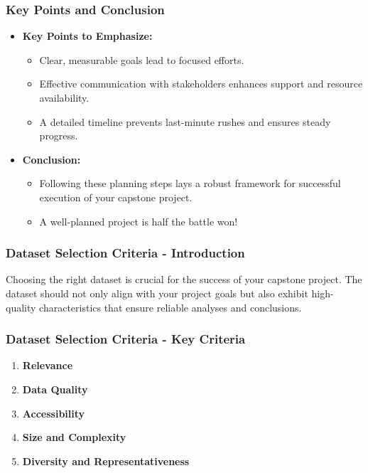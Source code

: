 \documentclass[aspectratio=169]{beamer}
\begin{document}
\begin{frame}[fragile]
    \frametitle{Key Points and Conclusion}
    \begin{itemize}
        \item \textbf{Key Points to Emphasize:}
        \begin{itemize}
            \item Clear, measurable goals lead to focused efforts.
            \item Effective communication with stakeholders enhances support and resource availability.
            \item A detailed timeline prevents last-minute rushes and ensures steady progress.
        \end{itemize}
        
        \item \textbf{Conclusion:}
        \begin{itemize}
            \item Following these planning steps lays a robust framework for successful execution of your capstone project.
            \item A well-planned project is half the battle won!
        \end{itemize}
    \end{itemize}
\end{frame}

\begin{frame}[fragile]
    \frametitle{Dataset Selection Criteria - Introduction}
    Choosing the right dataset is crucial for the success of your capstone project. 
    The dataset should not only align with your project goals but also exhibit high-quality characteristics that ensure reliable analyses and conclusions. 
\end{frame}

\begin{frame}[fragile]
    \frametitle{Dataset Selection Criteria - Key Criteria}
    \begin{enumerate}
        \item \textbf{Relevance}
        \item \textbf{Data Quality}
        \item \textbf{Accessibility}
        \item \textbf{Size and Complexity}
        \item \textbf{Diversity and Representativeness}
    \end{enumerate}
\end{frame}
\end{document}
